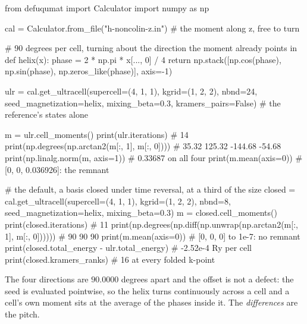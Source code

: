 \documentclass[11pt,a4paper]{article}
\begin{document}
\begin{pycode}
from defuqumat import Calculator
import numpy as np

cal = Calculator.from_file("h-noncolin-z.in")  # the moment along z, free to turn

# 90 degrees per cell, turning about the direction the moment already points in
def helix(x):
    phase = 2 * np.pi * x[..., 0] / 4
    return np.stack([np.cos(phase), np.sin(phase),
                     np.zeros_like(phase)], axis=-1)

ulr = cal.get_ultracell(supercell=(4, 1, 1), kgrid=(1, 2, 2), nbnd=24,
                        seed_magnetization=helix, mixing_beta=0.3,
                        kramers_pairs=False)   # the reference's states alone

m = ulr.cell_moments()
print(ulr.iterations)                              # 14
print(np.degrees(np.arctan2(m[:, 1], m[:, 0])))    # 35.32 125.32 -144.68 -54.68
print(np.linalg.norm(m, axis=1))                   # 0.33687 on all four
print(m.mean(axis=0))                              # [0, 0, 0.036926]: the remnant

# the default, a basis closed under time reversal, at a third of the size
closed = cal.get_ultracell(supercell=(4, 1, 1), kgrid=(1, 2, 2), nbnd=8,
                           seed_magnetization=helix, mixing_beta=0.3)
m = closed.cell_moments()
print(closed.iterations)                           # 11
print(np.degrees(np.diff(np.unwrap(np.arctan2(m[:, 1], m[:, 0])))))  # 90 90 90
print(m.mean(axis=0))                              # [0, 0, 0] to 1e-7: no remnant
print(closed.total_energy - ulr.total_energy)      # -2.52e-4 Ry per cell
print(closed.kramers_ranks)                        # 16 at every folded k-point
\end{pycode}

The four directions are $90.0000$ degrees apart and the offset is not a defect:
the seed is evaluated pointwise, so the helix turns continuously across a cell
and a cell's own moment sits at the average of the phases inside it. The
\emph{differences} are the pitch.
\end{document}
